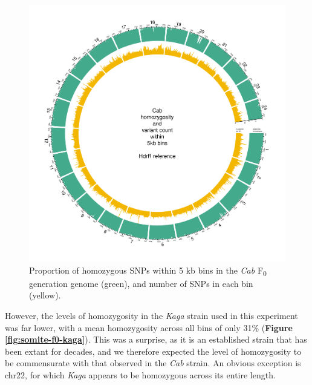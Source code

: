 \documentclass[
]{book}
\begin{document}
\begin{figure}
\includegraphics[width=1\linewidth]{figs/somites/Cab} \caption{Proportion of homozygous SNPs within 5 kb bins in the \emph{Cab} F\textsubscript{0} generation genome (green), and number of SNPs in each bin (yellow).}\label{fig:somite-f0-cab}
\end{figure}

\clearpage

However, the levels of homozygosity in the \emph{Kaga} strain used in this experiment was far lower, with a mean homozygosity across all bins of only 31\% (\textbf{Figure \ref{fig:somite-f0-kaga}}). This was a surprise, as it is an established strain that has been extant for decades, and we therefore expected the level of homozygosity to be commensurate with that observed in the \emph{Cab} strain. An obvious exception is chr22, for which \emph{Kaga} appears to be homozygous across its entire length.
\end{document}
